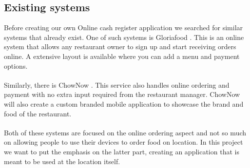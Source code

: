 \documentclass[12pt]{article}
\begin{document}
\begin{multicols}{2}
\subsection{Existing systems}
Before creating our own Online cash register application we searched for similar systems that already exist. One of such systems is Gloriafood \cite{Gloriafood:online}. This is an online system that allows any restaurant owner to sign up and start receiving orders online. A extensive layout is available where you can add a menu and payment options.
\\\\
Similarly, there is ChowNow \cite{Chownow:online}. This service also handles online ordering and payment with no extra input required from the restaurant manager. ChowNow will also create a custom branded mobile application to showcase the brand and food of the restaurant.
\\\\
Both of these systems are focused on the online ordering aspect and not so much on allowing people to use their devices to order food on location. In this project we want to put the emphasis on the latter part, creating an application that is meant to be used at the location itself.
\end{multicols}
\end{document}
